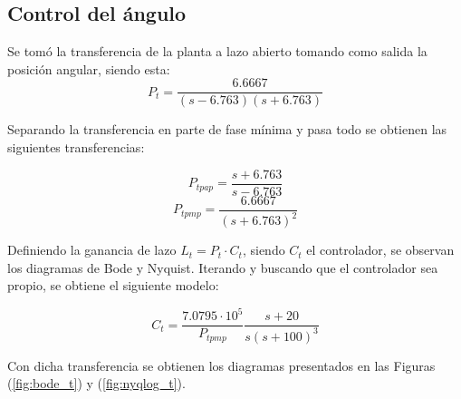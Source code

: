 %
%
%

\subsection{Control del ángulo}
\label{sec:ls_angulo}

Se tomó la transferencia de la planta a lazo abierto tomando como salida la posición angular, siendo esta:
\begin{equation*}
	P_t = \frac{6.6667}{(s - 6.763)(s + 6.763)}
	\label{eq:p_t}
\end{equation*}

Separando la transferencia en parte de fase mínima y pasa todo se obtienen las siguientes transferencias:

\begin{multicols}{2}
\begin{equation*}
	P_{tpap} = \frac{s + 6.763}{s - 6.763}
	\label{eq:p_t_pap}
\end{equation*}
\begin{equation*}
	P_{tpmp} = \frac{6.6667}{(s + 6.763)^2}
	\label{eq:p_t_pmp}
\end{equation*}
\end{multicols}

Definiendo la ganancia de lazo $L_t = P_t \cdot C_t$, siendo $C_t$ el controlador, se observan los diagramas de Bode y Nyquist. Iterando y buscando que el controlador sea propio, se obtiene el siguiente modelo:

\begin{equation*}
	C_t = \frac{7.0795 \cdot {10}^5}{P_{tpmp}} \frac{ s + 20 }{s (s + 100)^3}	
\end{equation*}

Con dicha transferencia se obtienen los diagramas presentados en las Figuras (\ref{fig:bode_t}) y (\ref{fig:nyqlog_t}).

